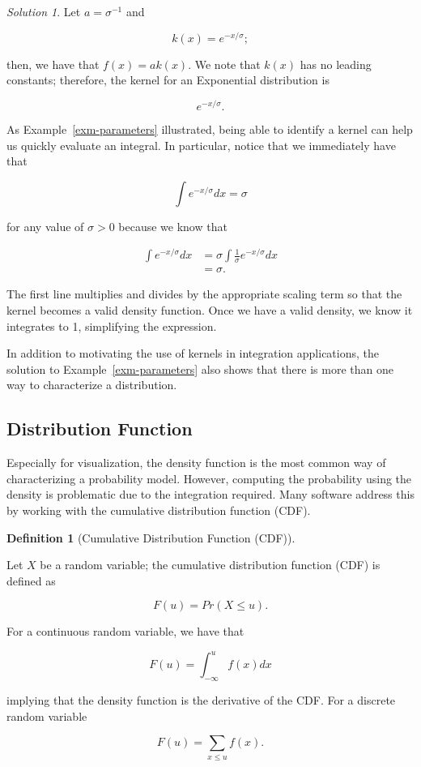 \documentclass[
  letterpaper,
  DIV=11,
  numbers=noendperiod]{scrreprt}
\theoremstyle{definition}
\newtheorem{definition}{Definition}[chapter]
\theoremstyle{plain}
\theoremstyle{definition}
\theoremstyle{remark}
\newtheorem*{solution}{Solution}
\begin{document}
\begin{solution}

Let \(a = \sigma^{-1}\) and

\[k(x) = e^{-x/\sigma};\]

then, we have that \(f(x) = a k(x)\). We note that \(k(x)\) has no
leading constants; therefore, the kernel for an Exponential distribution
is

\[e^{-x/\sigma}.\]

\end{solution}

As Example~\ref{exm-parameters} illustrated, being able to identify a
kernel can help us quickly evaluate an integral. In particular, notice
that we immediately have that

\[\int e^{-x/\sigma} dx = \sigma\]

for any value of \(\sigma > 0\) because we know that

\[
\begin{aligned}
  \int e^{-x / \sigma} dx 
    &= \sigma \int \frac{1}{\sigma} e^{-x / \sigma} dx \\
    &= \sigma.
\end{aligned}
\]

The first line multiplies and divides by the appropriate scaling term so
that the kernel becomes a valid density function. Once we have a valid
density, we know it integrates to 1, simplifying the expression.

In addition to motivating the use of kernels in integration
applications, the solution to Example~\ref{exm-parameters} also shows
that there is more than one way to characterize a distribution.

\hypertarget{distribution-function}{%
\subsection{Distribution Function}\label{distribution-function}}

Especially for visualization, the density function is the most common
way of characterizing a probability model. However, computing the
probability using the density is problematic due to the integration
required. Many software address this by working with the cumulative
distribution function (CDF).

\begin{definition}[Cumulative Distribution Function
(CDF)]\protect\hypertarget{def-cdf}{}\label{def-cdf}

Let \(X\) be a random variable; the cumulative distribution function
(CDF) is defined as

\[F(u) = Pr(X \leq u).\]

For a continuous random variable, we have that

\[F(u) = \int_{-\infty}^{u} f(x) dx\]

implying that the density function is the derivative of the CDF. For a
discrete random variable

\[F(u) = \sum_{x \leq u} f(x).\]

\end{definition}
\end{document}
